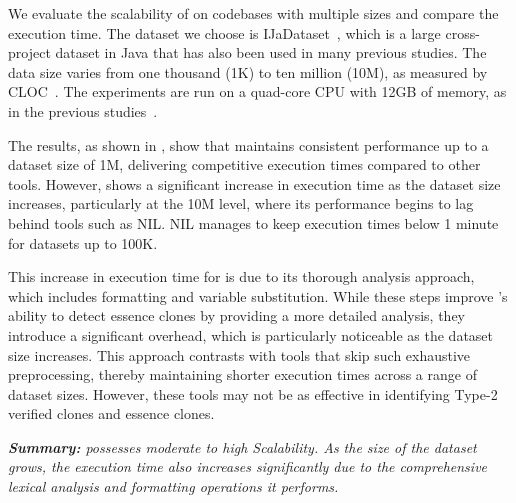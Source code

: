 We evaluate the scalability of \toolname on codebases with multiple sizes and compare the execution time. The dataset we choose is IJaDataset~\cite{ijadataset}, which is a large cross-project dataset in Java that has also been used in many previous studies. The data size varies from one thousand (1K) to ten million (10M), as measured by CLOC~\cite{cloc}. The experiments are run on a quad-core CPU with 12GB of memory, as in the previous studies~\cite{nil2021,wang2018ccaligner,code2img2023}.

The results, as shown in , show that \toolname maintains consistent performance up to a dataset size of 1M, delivering competitive execution times compared to other tools. However, \toolname shows a significant increase in execution time as the dataset size increases, particularly at the 10M level, where its performance begins to lag behind tools such as NIL. NIL manages to keep execution times below 1 minute for datasets up to 100K.

This increase in execution time for \toolname is due to its thorough analysis approach, which includes formatting and variable substitution. While these steps improve \toolname's ability to detect essence clones by providing a more detailed analysis, they introduce a significant overhead, which is particularly noticeable as the dataset size increases. This approach contrasts with tools that skip such exhaustive preprocessing, thereby maintaining shorter execution times across a range of dataset sizes. However, these tools may not be as effective in identifying Type-2 verified clones and essence clones.




\begin{titleEnv}
\emph{
\textbf{Summary:}
\toolname possesses moderate to high Scalability. As the size of the dataset grows, the execution time also increases significantly due to the comprehensive lexical analysis and formatting operations it performs.
}
\end{titleEnv}

